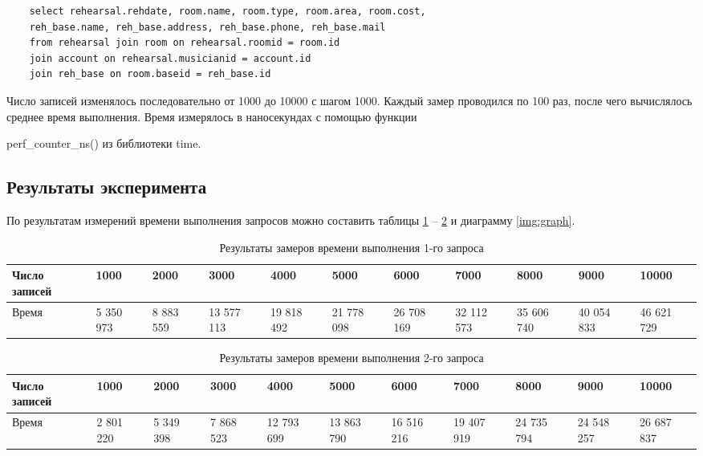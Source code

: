 \begin{lstlisting}
	select rehearsal.rehdate, room.name, room.type, room.area, room.cost,
	reh_base.name, reh_base.address, reh_base.phone, reh_base.mail
	from rehearsal join room on rehearsal.roomid = room.id
	join account on rehearsal.musicianid = account.id
	join reh_base on room.baseid = reh_base.id
\end{lstlisting}

Число записей изменялось последовательно от 1000 до 10000 с шагом 1000. Каждый замер проводился по 100 раз, после чего вычислялось среднее время выполнения. Время измерялось в наносекундах с помощью функции 

perf\_counter\_ns() из библиотеки time.

\subsection{Результаты эксперимента}

По результатам измерений времени выполнения запросов можно составить таблицы \ref{tab:first} – \ref{tab:second} и диаграмму \ref{img:graph}.

\begin{table}[!h]
	\captionsetup{justification=centering}
	\caption{\label{tab:first} Результаты замеров времени выполнения 1-го запроса}
	\begin{center}
		\begin{tabular}{|p{}|p{}|p{}|p{}|p{}|p{}|p{}|p{}|p{}|p{}|p{}|}
			\hline
			Число записей & 1000 & 2000 & 3000 & 4000 & 5000 & 6000 & 7000 & 8000 & 9000 & 10000\\
			\hline
			Время & 5 350 973 & 8 883 559 & 13 577 113 & 19 818 492 & 21 778 098 & 26 708 169 & 32 112 573 & 35 606 740 & 40 054 833 & 46 621 729\\
			\hline
		\end{tabular}
	\end{center}
\end{table}

\clearpage

\begin{table}[!h]
	\captionsetup{justification=centering}
	\caption{\label{tab:second} Результаты замеров времени выполнения 2-го запроса}
	\begin{center}
		\begin{tabular}{|p{}|p{}|p{}|p{}|p{}|p{}|p{}|p{}|p{}|p{}|p{}|}
			\hline
			Число записей & 1000 & 2000 & 3000 & 4000 & 5000 & 6000 & 7000 & 8000 & 9000 & 10000\\
			\hline
			Время & 2 801 220 & 5 349 398 & 7 868 523 & 12 793 699 & 13 863 790 & 16 516 216 & 19 407 919 & 24 735 794 & 24 548 257 & 26 687 837\\
			\hline
		\end{tabular}
	\end{center}
\end{table}

